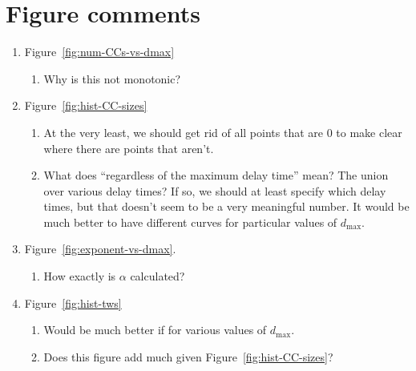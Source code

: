\section{Figure comments}


\begin{enumerate}
\item 
Figure~\ref{fig:num-CCs-vs-dmax}
\begin{enumerate}
  \item
    Why is this not monotonic?
\end{enumerate}
\item 
Figure~\ref{fig:hist-CC-sizes}
\begin{enumerate}
\item
At the very least, we should get rid of all points that are 0 to make clear where there are points that aren't.
\item
  What does ``regardless of the maximum delay time'' mean? The union over various delay times? If so, we should at least specify which delay times, but that doesn't seem to be a very meaningful number. 
  It would be much better to have different curves for particular values of $d_{\max}$.
\end{enumerate}

\item
Figure~\ref{fig:exponent-vs-dmax}.
\begin{enumerate}
\item How exactly is $\alpha$ calculated?
\end{enumerate}

\item
Figure~\ref{fig:hist-tws}
\begin{enumerate}
  \item Would be much better if for various values of $d_{\max}$.
  \item Does this figure add much given Figure~\ref{fig:hist-CC-sizes}?
\end{enumerate}
\end{enumerate}

